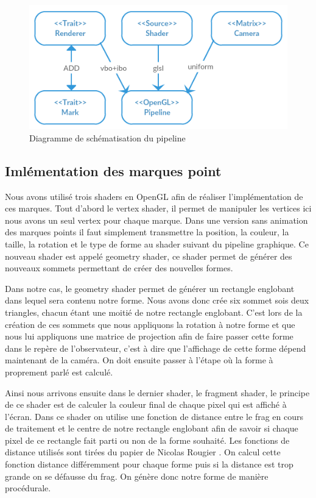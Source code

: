 \documentclass[12pt]{article}
\begin{document}
\begin{figure}[htp]
  \centering
  \includegraphics[scale=0.8]{images/pipeline}
  \caption{Diagramme de schématisation du pipeline}
  \label{fig:pipe}
\end{figure}


\subsection{Imlémentation des marques point}

Nous avons utilisé trois shaders en OpenGL afin de réaliser l'implémentation de ces marques. Tout d'abord le vertex shader, il permet de manipuler les vertices ici nous avons un seul vertex pour chaque marque. Dans une version sans animation des marques points il faut simplement transmettre la position, la couleur, la taille, la rotation et le type de forme au shader suivant du pipeline graphique. Ce nouveau shader est appelé geometry shader, ce shader permet de générer des nouveaux sommets permettant de créer des nouvelles formes. 

Dans notre cas, le geometry shader permet de générer un rectangle englobant dans lequel sera contenu notre forme. Nous avons donc crée six sommet sois deux triangles, chacun étant une moitié de notre rectangle englobant. C'est lors de la création de ces sommets que nous appliquons la rotation à notre forme et que nous lui appliquons une matrice de projection afin de faire passer cette forme dans le repère de l'observateur, c'est à dire que l'affichage de cette forme dépend maintenant de la caméra. On doit ensuite passer à l'étape où la forme à proprement parlé est calculé.

Ainsi nous arrivons ensuite dans le dernier shader, le fragment shader, le principe de ce shader est de calculer la couleur final de chaque pixel qui est affiché à l'écran. Dans ce shader on utilise une fonction de distance entre le \gls{frag} en cours de traitement et le centre de notre rectangle englobant afin de savoir si chaque pixel de ce rectangle fait parti ou non de la forme souhaité. Les fonctions de distance utilisés sont tirées du papier de Nicolas Rougier \cite{Rougier}. On calcul cette fonction distance différemment pour chaque forme puis si la distance est trop grande on se défausse du \gls{frag}. On génère donc notre forme de manière procédurale.
\end{document}

